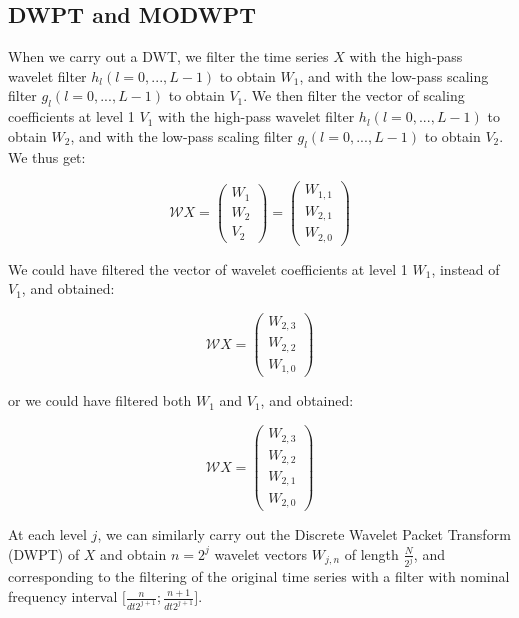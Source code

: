 \documentclass[workdone.tex]{subfiles}
\begin{document}
\subsection{DWPT and MODWPT}

When we carry out a DWT, we filter the time series $X$ with the high-pass wavelet filter $h_l \left( l = 0 , ... , L - 1 \right)$ to obtain $W_1$, and with the low-pass scaling filter $g_l \left( l = 0 , ... , L - 1 \right)$ to obtain $V_1$. We then filter the vector of scaling coefficients at level 1 $V_1$ with the high-pass wavelet filter $h_l \left( l = 0 , ... , L - 1 \right)$ to obtain $W_2$, and with the low-pass scaling filter $g_l \left( l = 0 , ... , L - 1 \right)$ to obtain $V_2$. We thus get:

\begin{equation}
\mathcal{W} X = \begin{pmatrix}
W_1 \\
W_2 \\
V_2
\end{pmatrix} = \begin{pmatrix}
W_{1,1} \\
W_{2,1} \\
W_{2,0}
\end{pmatrix}
\end{equation}

We could have filtered the vector of wavelet coefficients at level 1 $W_1$, instead of $V_1$, and obtained:

\begin{equation}
\mathcal{W} X = \begin{pmatrix}
W_{2,3} \\
W_{2,2} \\
W_{1,0}
\end{pmatrix}
\end{equation}

or we could have filtered both $W_1$ and $V_1$, and obtained:

\begin{equation}
\mathcal{W} X = \begin{pmatrix}
W_{2,3} \\
W_{2,2} \\
W_{2,1} \\
W_{2,0}
\end{pmatrix}
\end{equation}

At each level $j$, we can similarly carry out the Discrete Wavelet Packet Transform (DWPT) of $X$ and obtain $n = 2^j$ wavelet vectors $W_{j,n}$ of length $\frac{N}{2^j}$, and corresponding to the filtering of the original time series with a filter with nominal frequency interval $\lbrack \frac{n}{dt 2^{j + 1}} ; \frac{n + 1}{dt 2^{j + 1}} \rbrack$. \\
\end{document}
